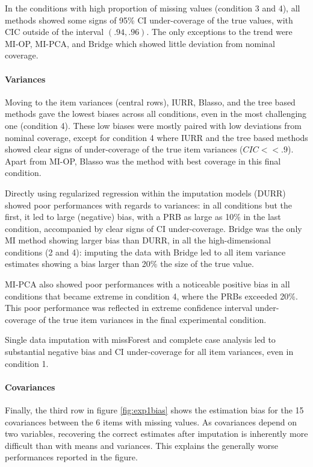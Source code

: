 	In the conditions with high proportion of missing values (condition 3 and 4), all methods showed some signs of 
	95\% CI under-coverage of the true values, with CIC outside of the interval $(.94, .96)$.
	The only exceptions to the trend were MI-OP, MI-PCA, and Bridge which showed little deviation from nominal coverage.

	\paragraph{Variances} 
	Moving to the item variances (central rows), IURR, Blasso, and the tree based methods gave the lowest
	biases across all conditions, even in the most challenging one (condition 4).
	These low biases were mostly paired with low deviations from nominal coverage, except for condition 4 where 
	IURR and the tree based methods showed clear signs of under-coverage of the true item variances ($CIC << .9$).
	Apart from MI-OP, Blasso was the method with best coverage in this final condition.
	
	Directly using regularized regression within the imputation models (DURR) showed poor performances with regards 
	to variances: in all conditions but the first, it led to large (negative) bias, with a PRB as large as 10\% in 
	the last condition, accompanied by clear signs of CI under-coverage.
	Bridge was the only MI method showing larger bias than DURR, in all the high-dimensional conditions (2 and 4):
	imputing the data with Bridge led to all item variance estimates showing a bias larger than 20\% the size of the
	true value.

	MI-PCA also showed poor performances with a noticeable positive bias in all conditions that became extreme in
	condition 4, where the PRBs exceeded 20\%.
	This poor performance was reflected in extreme confidence interval under-coverage of the true item variances in
	the final experimental condition.

	Single data imputation with missForest and complete case analysis led to substantial negative bias and 
	CI under-coverage for all item variances, even in condition 1.

	\paragraph{Covariances}
	Finally, the third row in figure \ref{fig:exp1bias} shows the estimation bias for the 15 covariances between 
	the 6 items with missing values.
	As covariances depend on two variables, recovering the correct estimates after imputation is inherently 
	more difficult than with means and variances.
	This explains the generally worse performances reported in the figure.

